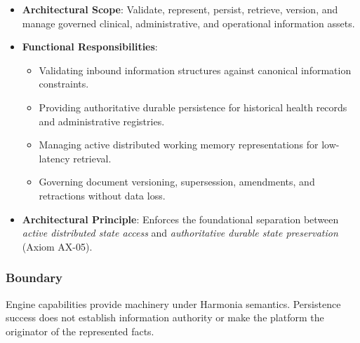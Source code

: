 \begin{itemize}

\item
\textbf{Architectural Scope}: Validate, represent, persist, retrieve, version, and manage governed clinical, administrative, and operational information assets.



\item
\textbf{Functional Responsibilities}:


\begin{itemize}

\item
Validating inbound information structures against canonical information constraints.



\item
Providing authoritative durable persistence for historical health records and administrative registries.



\item
Managing active distributed working memory representations for low-latency retrieval.



\item
Governing document versioning, supersession, amendments, and retractions without data loss.



\end{itemize}


\item
\textbf{Architectural Principle}: Enforces the foundational separation between \emph{active distributed state access} and \emph{authoritative durable state preservation} (Axiom AX-05).



\end{itemize}
\subsubsection*{Boundary}

Engine capabilities provide machinery under Harmonia semantics. Persistence success does not establish information authority or make the platform the originator of the represented facts.

